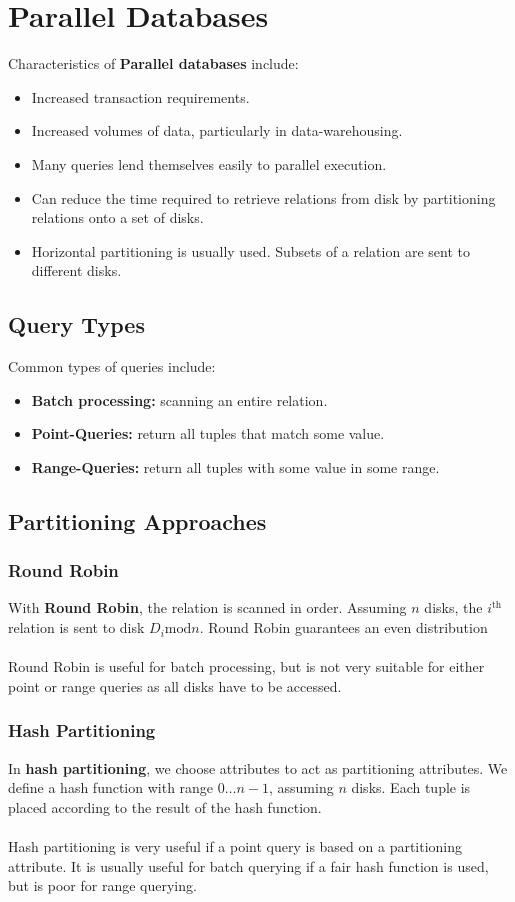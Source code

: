 \documentclass[a4paper,11pt]{article}
\begin{document}
\section{Parallel Databases}
Characteristics of \textbf{Parallel databases} include:
\begin{itemize}
    \item   Increased transaction requirements.
    \item   Increased volumes of data, particularly in data-warehousing.
    \item   Many queries lend themselves easily to parallel execution.
    \item   Can reduce the time required to retrieve relations from disk by partitioning relations onto a set of 
            disks.
    \item   Horizontal partitioning is usually used.
            Subsets of a relation are sent to different disks.
\end{itemize}

\subsection{Query Types}
Common types of queries include:
\begin{itemize}
    \item   \textbf{Batch processing:} scanning an entire relation.
    \item   \textbf{Point-Queries:} return all tuples that match some value.
    \item   \textbf{Range-Queries:} return all tuples with some value in some range.
\end{itemize}

\subsection{Partitioning Approaches}
\subsubsection{Round Robin}
With \textbf{Round Robin}, the relation is scanned in order. 
Assuming $n$ disks, the $i^\text{th}$ relation is sent to disk $D_i\text{mod}n$.
Round Robin guarantees an even distribution
\\\\
Round Robin is useful for batch processing, but is not very suitable for either point or range queries as all 
disks have to be accessed.

\subsubsection{Hash Partitioning}
In \textbf{hash partitioning}, we choose attributes to act as partitioning attributes.
We define a hash function with range $0 \dots n-1$, assuming $n$ disks. 
Each tuple is placed according to the result of the hash function.
\\\\
Hash partitioning is very useful if a point query is based on a partitioning attribute. 
It is usually useful for batch querying if a fair hash function is used, but is poor for range querying.
\end{document}
